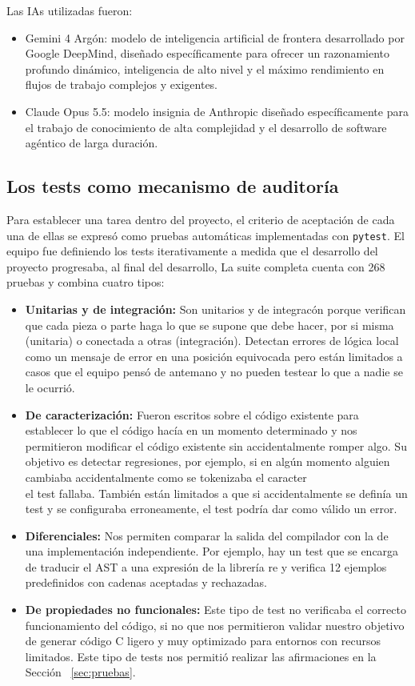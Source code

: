 \documentclass[runningheads]{llncs}
\begin{document}
Las IAs utilizadas fueron:
\begin{itemize}
    \item Gemini 4 Argón: modelo de inteligencia artificial de frontera desarrollado por Google DeepMind, diseñado específicamente para ofrecer un razonamiento profundo dinámico, inteligencia de alto nivel y el máximo rendimiento en flujos de trabajo complejos y exigentes.
    \item Claude Opus 5.5: modelo insignia de Anthropic diseñado específicamente para el trabajo de conocimiento de alta complejidad y el desarrollo de software agéntico de larga duración.
\end{itemize}

\subsection{Los tests como mecanismo de auditoría}

Para establecer una tarea dentro del proyecto, el criterio de aceptación de cada una de ellas se expresó como pruebas automáticas implementadas con \texttt{pytest}. El equipo fue definiendo los tests iterativamente a medida que el desarrollo del proyecto progresaba, al final del desarrollo, La suite completa cuenta con 268 pruebas y combina cuatro tipos:
\begin{itemize}
  \item \textbf{Unitarias y de integración:} Son unitarios y de integracón porque verifican que cada pieza o parte haga lo que se supone que debe hacer, por si misma (unitaria) o conectada a otras (integración). Detectan errores de lógica local como un mensaje de error en una posición equivocada pero están limitados a casos que el equipo pensó de antemano y no pueden testear lo que a nadie se le ocurrió. 
  \item \textbf{De caracterización:} Fueron escritos sobre el código existente para establecer lo que el código hacía en un momento determinado y nos permitieron modificar el código existente sin accidentalmente romper algo. Su objetivo es detectar regresiones, por ejemplo, si en algún momento alguien cambiaba accidentalmente como se tokenizaba el caracter \\ el test fallaba. También están limitados a que si accidentalmente se definía un test y se configuraba erroneamente, el test podría dar como válido un error.
  \item \textbf{Diferenciales:} Nos permiten comparar la salida del compilador con la de una implementación independiente. Por ejemplo, hay un test que se encarga de traducir el AST a una expresión de la librería re y verifica 12 ejemplos predefinidos con cadenas aceptadas y rechazadas.
  \item \textbf{De propiedades no funcionales:} Este tipo de test no verificaba el correcto funcionamiento del código, si no que nos permitieron validar nuestro objetivo de generar código C ligero y muy optimizado para entornos con recursos limitados. Este tipo de tests nos permitió realizar las afirmaciones en la Sección ~\ref{sec:pruebas}.
\end{itemize}
\end{document}
